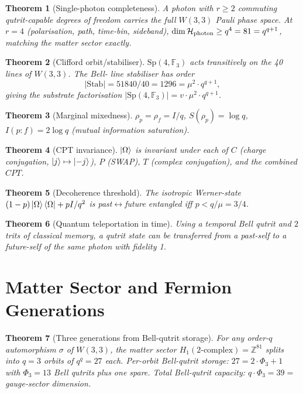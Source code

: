 \documentclass[11pt]{article}
\newtheorem{theorem}{Theorem}
\newcommand{\ZZ}{\mathbb{Z}}
\newcommand{\Sp}{\mathrm{Sp}}
\newcommand{\GF}[1]{\mathbb{F}_{#1}}
\begin{document}
\begin{theorem}[Single-photon completeness]\label{thm:completeness}
A photon with $r \ge 2$ commuting qutrit-capable degrees of freedom
carries the full $W(3,3)$ Pauli phase space.  At $r = 4$ (polarisation,
path, time-bin, sideband), $\dim\mathcal H_{\rm photon} \ge q^4 = 81 =
q^{q+1}$, matching the matter sector exactly.
\end{theorem}

\begin{theorem}[Clifford orbit/stabiliser]\label{thm:clifford}
$\Sp(4,\GF{3})$ acts transitively on the 40 lines of $W(3,3)$.  The Bell-
line stabiliser has order
\begin{equation}
  |\mathrm{Stab}| = 51840 / 40 = 1296 = \mu^2 \cdot q^{q+1},
\end{equation}
giving the substrate factorisation
$|\Sp(4,\GF{3})| = v\cdot\mu^2\cdot q^{q+1}$.
\end{theorem}

\begin{theorem}[Marginal mixedness]\label{thm:marginal}
$\rho_p = \rho_f = I/q$, $S(\rho_p) = \log q$, $I(p:f) = 2\log q$ (mutual
information saturation).
\end{theorem}

\begin{theorem}[CPT invariance]\label{thm:cpt}
$\ket{\Omega}$ is invariant under each of $C$ (charge conjugation,
$\ket{j}\mapsto\ket{-j}$), $P$ (SWAP), $T$ (complex conjugation), and
the combined $CPT$.
\end{theorem}

\begin{theorem}[Decoherence threshold]\label{thm:noise}
The isotropic Werner-state $(1-p)\ket{\Omega}\bra{\Omega} + p I/q^2$ is
past$\leftrightarrow$future entangled iff $p < q/\mu = 3/4$.
\end{theorem}

\begin{theorem}[Quantum teleportation in time]\label{thm:teleport}
Using a temporal Bell qutrit and $2$ trits of classical memory, a qutrit
state can be transferred from a past-self to a future-self of the same
photon with fidelity 1.
\end{theorem}

\section{Matter Sector and Fermion Generations}

\begin{theorem}[Three generations from Bell-qutrit storage]\label{thm:gens}
For any order-$q$ automorphism $\sigma$ of $W(3,3)$, the matter sector
$H_1(2\text{-complex}) = \ZZ^{81}$ splits into $q = 3$ orbits of
$q^q = 27$ each.  Per-orbit Bell-qutrit storage:
$27 = 2\cdot\Phi_3 + 1$ with $\Phi_3 = 13$ Bell qutrits plus one spare.
Total Bell-qutrit capacity: $q\cdot\Phi_3 = 39 = $ gauge-sector
dimension.
\end{theorem}
\end{document}
